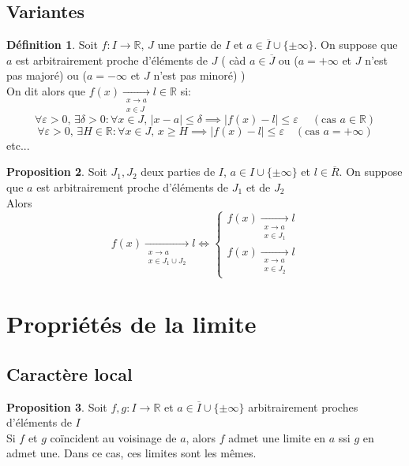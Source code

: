 \documentclass[10pt,a4paper]{article}
\theoremstyle{definition}
\newtheorem{proposition}{Proposition}[section]
\newtheorem{definition}[proposition]{Définition}
\begin{document}
\subsection{Variantes}
\begin{definition}
Soit $f: I \to \mathbb{R}$, $J$ une partie de $I$ et $a \in \overline{I} \cup \{ \pm\infty \}$. On suppose que $a$ est arbitrairement proche d'éléments de $J$ ( càd $a \in \overline{J}$ ou ($a = +\infty$ et $J$ n'est pas majoré) ou ($a = -\infty$ et $J$ n'est pas minoré) ) \\
On dit alors que $f(x) \xrightarrow[\substack{x \to a \\ x \in J}]{} l \in \mathbb{R}$ si:
\[\forall \varepsilon > 0, \, \exists \delta > 0: \forall x \in J, \, |x - a| \leq \delta \implies |f(x) - l| \leq \varepsilon\ \quad (\text{cas } a \in \mathbb{R})\]
\[\forall \varepsilon > 0, \, \exists H \in \mathbb{R}: \forall x \in J, \, x \geq H \implies |f(x) - l| \leq \varepsilon \quad (\text{cas } a = +\infty)\]
etc...
\end{definition}
\begin{proposition}
Soit $J_1, J_2$ deux parties de $I$, $a \in I \cup \{ \pm\infty \}$ et $l \in \overline{R}$. On suppose que $a$ est arbitrairement proche d'éléments de $J_1$ et de $J_2$ \\
Alors
\[ f(x) \xrightarrow[\substack{x \to a \\ x \in J_1 \cup J_2}]{} l \iff \begin{cases}
f(x) \xrightarrow[\substack{x \to a \\ x \in J_1}]{} l \\ f(x) \xrightarrow[\substack{x \to a \\ x \in J_2}]{} l \end{cases}\]
\end{proposition}

\section{Propriétés de la limite}
\subsection{Caractère local}
\begin{proposition}
Soit $f, g: I \to \mathbb{R}$ et $a \in \overline{I} \cup \{ \pm\infty \}$ arbitrairement proches d'éléments de $I$ \\
Si $f$ et $g$ coïncident au voisinage de $a$, alors $f$ admet une limite en $a$ ssi $g$ en admet une. Dans ce cas, ces limites sont les mêmes.
\end{proposition}
\end{document}
